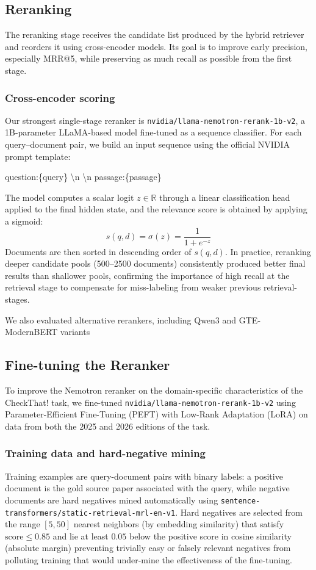 \subsection{Reranking} \label{sub:reranking}

The reranking stage receives the candidate list produced by the hybrid retriever and reorders it using cross-encoder models. Its goal is to improve early precision, especially MRR@5, while preserving as much recall as possible from the first stage.

\subsubsection*{Cross-encoder scoring}
Our strongest single-stage reranker is \texttt{nvidia/llama-nemotron-rerank-1b-v2}, a 1B-parameter LLaMA-based model fine-tuned as a sequence classifier. For each query--document pair, we build an input sequence using the official NVIDIA prompt template:
\begin{promptbox}
\small\ttfamily
question:\{query\} \textbackslash n \textbackslash n passage:\{passage\}
\end{promptbox}
The model computes a scalar logit $z \in \mathbb{R}$ through a linear classification head applied to the final hidden state, and the relevance score is obtained by applying a sigmoid:
\[
  s(q, d) = \sigma(z) = \frac{1}{1 + e^{-z}}
\]
Documents are then sorted in descending order of $s(q, d)$.
In practice, reranking deeper candidate pools (500--2500 documents) consistently produced better final results than shallower pools, confirming the importance of high recall at the retrieval stage to compensate for miss-labeling from weaker previous retrieval-stages.

We also evaluated alternative rerankers, including Qwen3 and GTE-ModernBERT variants

\subsection{Fine-tuning the Reranker} \label{sub:finetuning}
To improve the Nemotron reranker on the domain-specific characteristics of the CheckThat! task, we fine-tuned \texttt{nvidia/llama-nemotron-rerank-1b-v2} using Parameter-Efficient Fine-Tuning (PEFT) with Low-Rank Adaptation (LoRA)
on data from both the 2025 and 2026 editions of the task.

\subsubsection*{Training data and hard-negative mining}
Training examples are query-document pairs with binary labels: a positive document is the gold source paper associated with the query, while negative documents are hard negatives mined automatically using \texttt{sentence-transformers/static-retrieval-mrl-en-v1}. Hard negatives are selected from the range $[5, 50]$ nearest neighbors (by embedding similarity) that satisfy $\text{score} \leq 0.85$ and lie at least $0.05$ below the positive score in cosine similarity (absolute margin) preventing trivially easy or falsely relevant negatives from polluting training that would under-mine the effectiveness of the fine-tuning.


